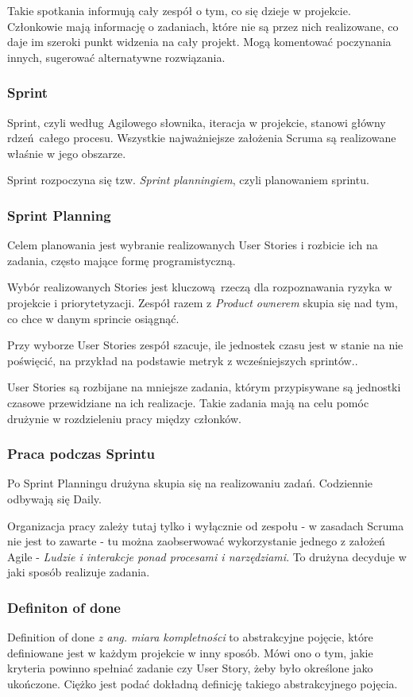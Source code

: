 \documentclass{article}
\begin{document}
Takie spotkania informują cały zespół o tym, co się dzieje w projekcie. Członkowie mają informację o zadaniach, które nie są przez nich realizowane, co daje im szeroki punkt widzenia na cały projekt. Mogą komentować poczynania innych, sugerować alternatywne rozwiązania.

\subsubsection*{Sprint}
Sprint, czyli według Agilowego słownika, iteracja w projekcie, stanowi główny rdzeń całego procesu. Wszystkie najważniejsze założenia Scruma są realizowane właśnie w jego obszarze.

Sprint rozpoczyna się tzw. \textit{Sprint planningiem}, czyli planowaniem sprintu.

\subsubsection*{Sprint Planning}

Celem planowania jest wybranie realizowanych User Stories i rozbicie ich na zadania, często mające formę programistyczną.

Wybór realizowanych Stories jest kluczową rzeczą dla rozpoznawania ryzyka w projekcie i priorytetyzacji. Zespół razem z \textit{Product ownerem} skupia się nad tym, co chce w danym sprincie osiągnąć\cite{scrum}.

Przy wyborze User Stories zespół szacuje, ile jednostek czasu jest w stanie na nie poświęcić, na przykład na podstawie metryk z wcześniejszych sprintów.\cite{scrum}.

User Stories są rozbijane na mniejsze zadania, którym przypisywane są jednostki czasowe przewidziane na ich realizacje. Takie zadania mają na celu pomóc drużynie w rozdzieleniu pracy między członków.

\subsubsection*{Praca podczas Sprintu}
Po Sprint Planningu drużyna skupia się na realizowaniu zadań. Codziennie odbywają się Daily.

Organizacja pracy zależy tutaj tylko i wyłącznie od zespołu - w zasadach Scruma nie jest to zawarte - tu można zaobserwować wykorzystanie jednego z założeń Agile - \textit{Ludzie i interakcje ponad procesami i narzędziami}. To drużyna decyduje w jaki sposób realizuje zadania.

\subsubsection*{Definiton of done}
Definition of done \textit{z ang. miara kompletności} to abstrakcyjne pojęcie, które definiowane jest w każdym projekcie w inny sposób. Mówi ono o tym, jakie kryteria powinno spełniać zadanie czy User Story, żeby było określone jako ukończone. Ciężko jest podać dokładną definicję takiego abstrakcyjnego pojęcia.
\end{document}
